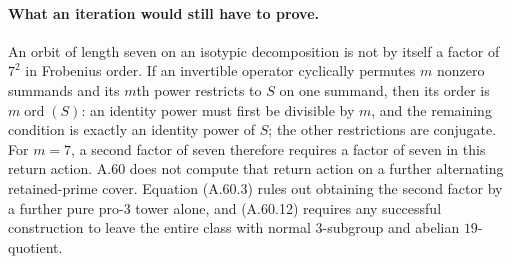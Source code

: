 \paragraph{What an iteration would still have to prove.}
An orbit of length seven on an isotypic decomposition is
not by itself a factor of $7^2$ in Frobenius order.
If an invertible operator cyclically permutes $m$ nonzero
summands and its $m$th power restricts to $S$ on one
summand, then its order is $m\operatorname{ord}(S)$:
an identity power must first be divisible by $m$, and
the remaining condition is exactly an identity power
of $S$; the other restrictions are conjugate.
For $m=7$, a second factor of seven therefore requires
a factor of seven in this return action.
A.60 does not compute that return action on a further
alternating retained-prime cover.  Equation (A.60.3)
rules out obtaining the second factor by a further
pure pro-$3$ tower alone, and (A.60.12) requires any
successful construction to leave the entire class with
normal $3$-subgroup and abelian $19$-quotient.
